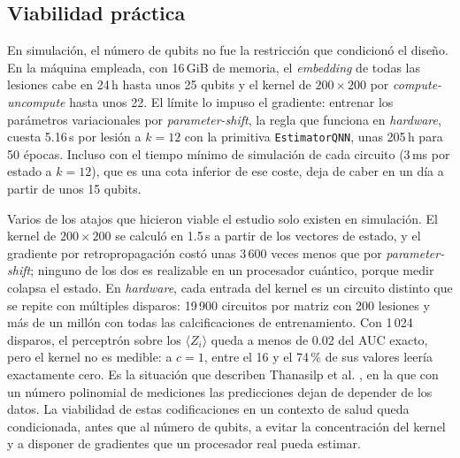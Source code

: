 
\subsection{Viabilidad práctica}
\label{sec:conclusion_viabilidad}

En simulación, el número de qubits no fue la restricción que condicionó el diseño. En la máquina
empleada, con 16\,GiB de memoria, el \textit{embedding} de todas las lesiones cabe en 24\,h hasta unos
25 qubits y el kernel de $200 \times 200$ por \textit{compute-uncompute} hasta unos 22. El límite lo
impuso el gradiente: entrenar los parámetros variacionales por \textit{parameter-shift}, la regla que
funciona en \textit{hardware}, cuesta 5.16\,s por lesión a $k = 12$ con la primitiva \texttt{EstimatorQNN},
unas 205\,h para 50 épocas. Incluso con el tiempo mínimo de simulación de cada circuito (3\,ms por estado
a $k = 12$), que es una cota inferior de ese coste, deja de caber en un día a partir de unos 15 qubits.

Varios de los atajos que hicieron viable el estudio solo existen en simulación. El kernel de
$200 \times 200$ se calculó en 1.5\,s a partir de los vectores de estado, y el gradiente por
retropropagación costó unas 3\,600 veces menos que por \textit{parameter-shift}; ninguno de los dos es
realizable en un procesador cuántico, porque medir colapsa el estado. En \textit{hardware}, cada entrada
del kernel es un circuito distinto que se repite con múltiples disparos: 19\,900 circuitos por matriz
con 200 lesiones y más de un millón con todas las calcificaciones de entrenamiento. Con 1\,024
disparos, el perceptrón sobre los $\langle Z_i\rangle$ queda a menos de 0.02 del AUC exacto, pero el
kernel no es medible: a $c = 1$, entre el 16 y el 74\,\% de sus valores leería exactamente cero. Es la
situación que describen Thanasilp et al. \cite{Thanasilp2024}, en la que con un número polinomial de
mediciones las predicciones dejan de depender de los datos. La viabilidad de estas codificaciones en un
contexto de salud queda condicionada, antes que al número de qubits, a evitar la concentración del kernel
y a disponer de gradientes que un procesador real pueda estimar.

